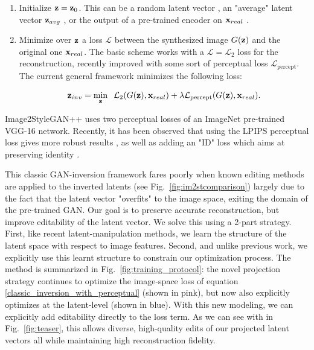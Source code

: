 \begin{enumerate}
    \item Initialize $\mathbf{z}=\mathbf{z}_0$. This can be a random latent vector  \citep{abdal2019image2stylegan}, 
    an "average" latent vector $\mathbf{z}_{avg}$ \citep{karra2019stylegan, abdal2019image2stylegan, abdal2020}, 
    or the output of a pre-trained encoder on $\mathbf{x}_{real}$  \citep{zhu2020indomain, zhu2016generative}.  
    
    \item Minimize over $\mathbf{z}$ a loss $\mathcal{L}$  between the synthesized image $G(\mathbf{z})$ and the 
    original one $\mathbf{x}_{real}$. The basic scheme works with a $\mathcal{L}=\mathcal{L}_2$ loss for the 
    reconstruction, recently improved with some sort of perceptual loss $\mathcal{L}_{\text{percept}}$. 
    The current general framework  minimizes the following loss:
    

\begin{equation}\label{classic_inversion_with_perceptual}
    \mathbf{z}_{inv}  = \min_{\mathbf{z}}\;\;  \mathcal{L}_2(G(\mathbf{z}), \mathbf{x}_{real}) +\lambda \mathcal{L}_{\text{percept}}(G(\mathbf{z}), \mathbf{x}_{real}). \end{equation}
\end{enumerate}

Image2StyleGAN++ \citep{abdal2020}
uses two perceptual losses of an ImageNet pre-trained VGG-16 network. Recently, it has been observed 
that using the LPIPS \citep{zhanglpips2018} perceptual loss gives more robust results 
\citep{collaborative_learning, psp}, as well as adding an "ID" loss which aims at preserving 
identity \citep{psp, e4e}.


This classic GAN-inversion framework fares poorly when known editing methods are applied to the 
inverted latents (see Fig.~\ref{fig:im2stcomparison}) largely due to the fact that the latent 
vector "overfits"
to the image space, exiting the domain of the pre-trained \ac{GAN}. Our goal is to preserve accurate reconstruction, but improve editability of the 
latent vector. We solve this using a 2-part strategy. First, like recent latent-manipulation methods, 
we learn the structure of the latent space with respect to image features. Second, and unlike previous
 work, we explicitly use this learnt structure to constrain our optimization process. The method is
  summarized in Fig.~\ref{fig:training_protocol}: the novel projection strategy continues to optimize
   the image-space loss of equation \ref{classic_inversion_with_perceptual} (shown in pink), but now 
   also explicitly optimizes at the latent-level (shown in blue). With this new modeling, we can 
   explicitly add editability directly to the loss term. As we can see with in Fig.~\ref{fig:teaser},
    this allows diverse, high-quality edits of our projected latent vectors all while maintaining
     high reconstruction fidelity. 



